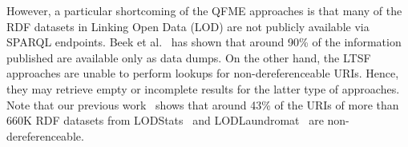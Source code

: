 However, a particular shortcoming of the QFME approaches is that many of the RDF datasets in Linking Open Data (LOD) are not publicly available via SPARQL endpoints. Beek et al.~\cite{beek2014lod} has shown that around 90\% of the information published are available only as data dumps. On the other hand, the LTSF approaches are unable to perform lookups for non-dereferenceable URIs. Hence, they may retrieve empty or incomplete results for the latter type of approaches. Note that our previous work~\cite{valdestilhas2018my} shows that around 43\% of the URIs of more than 660K RDF datasets from LODStats~\cite{ermilov2016lodstats} and LODLaundromat~\cite{beek2014lod} are non-dereferenceable. 
